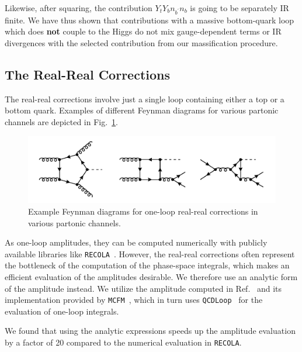 Likewise, after squaring, the contribution $Y_t Y_b n_{b^\prime} n_{b}$ is going to be separately \acs{IR} finite. We have thus shown that contributions with a massive bottom-quark loop which does \textbf{not} couple to the Higgs do not mix gauge-dependent terms or \acs{IR} divergences with the selected contribution from our massification procedure.

\subsection{The Real-Real Corrections}
The real-real corrections involve just a single loop containing either a top or a bottom quark. Examples of different Feynman diagrams for various partonic channels are depicted in Fig.~\ref{fig:5:real_real}.
\begin{figure}[ht]
  \centering
  \includegraphics[scale=0.5]{Images/NNLO_Feynman_diagrams/RealReal.pdf}
  \caption{Example Feynman diagrams for one-loop real-real corrections in various partonic channels.}
  \label{fig:5:real_real}
\end{figure}

As one-loop amplitudes, they can be computed numerically with publicly available libraries like \texttt{RECOLA}~\cite{Actis:2016mpe}. However, the real-real corrections often represent the bottleneck of the computation of the phase-space integrals, which makes an efficient evaluation of the amplitudes desirable. We therefore use an analytic form of the amplitude instead. We utilize the amplitude computed in Ref.~\cite{Budge:2020oyl} and its implementation provided by \texttt{MCFM}~\cite{Campbell:2019dru, Campbell:1999ah, Campbell:2011bn}, which in turn uses \texttt{QCDLoop}~\cite{Ellis:2007qk, Carrazza:2016gav} for the evaluation of one-loop integrals.

We found that using the analytic expressions speeds up the amplitude evaluation by a factor of 20 compared to the numerical evaluation in \texttt{RECOLA}.

